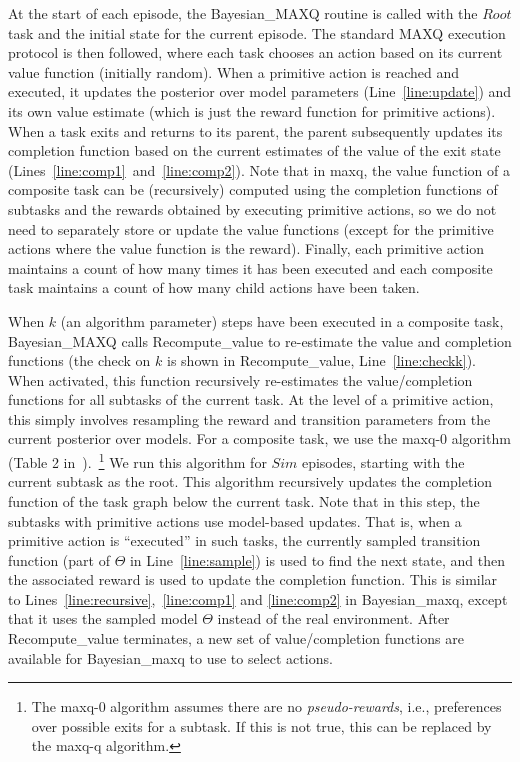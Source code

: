 At the start of each episode, the {\sc Bayesian\_MAXQ} routine is
called with the $Root$ task and the initial state for the current
episode. The standard MAXQ execution protocol is then followed, where
each task chooses an action based on its current value function
(initially random). When a primitive action is reached and executed,
it updates the posterior over model parameters
(Line~\ref{line:update}) and its own value estimate (which is just the
reward function for primitive actions). When a task exits and returns
to its parent, the parent subsequently updates its completion function
based on the current estimates of the value of the exit state
(Lines~\ref{line:comp1}~and~\ref{line:comp2}). Note that in {\sc
  maxq}, the value function of a composite task can be (recursively)
computed using the completion functions of subtasks and the rewards
obtained by executing primitive actions, so we do not need to
separately store or update the value functions (except for the
primitive actions where the value function is the reward). Finally,
each primitive action maintains a count of how many times it has been
executed and each composite task maintains a count of how many child
actions have been taken.

When $k$ (an algorithm parameter) steps have been executed in a
composite task, {\sc Bayesian\_MAXQ} calls {\sc Recompute\_value} to
re-estimate the value and completion functions (the check on $k$ is
shown in {\sc Recompute\_value}, Line~\ref{line:checkk}). When
activated, this function recursively re-estimates the value/completion functions for all
 subtasks of the current task. At the level of a primitive action, this
simply involves resampling the reward and transition parameters from
the current posterior over models. For a composite task, we use the
{\sc maxq-0} algorithm (Table 2 in~\cite{d-hrl-00}).~\footnote{The {\sc
    maxq-0} algorithm assumes there are no {\em pseudo-rewards}, i.e.,
  preferences over possible exits for a subtask. If this is not true,
  this can be replaced by the {\sc maxq-q} algorithm.} We run this algorithm
for $Sim$ episodes, starting with the current subtask as the root. This algorithm
recursively updates the completion function of the task graph below
the current task. Note that in this step, the subtasks with primitive
actions use model-based updates. That is, when a primitive action is
``executed'' in such tasks, the currently sampled transition function
(part of $\Theta$ in Line~\ref{line:sample}) is used to find the next
state, and then the associated reward is used to update the completion
function. This is similar to
Lines~\ref{line:recursive},~\ref{line:comp1} and \ref{line:comp2} in
{\sc Bayesian\_maxq}, except that it uses the sampled model $\Theta$
instead of the real environment. After {\sc Recompute\_value}
terminates, a new set of value/completion functions are available for
{\sc Bayesian\_maxq} to use to select actions.

